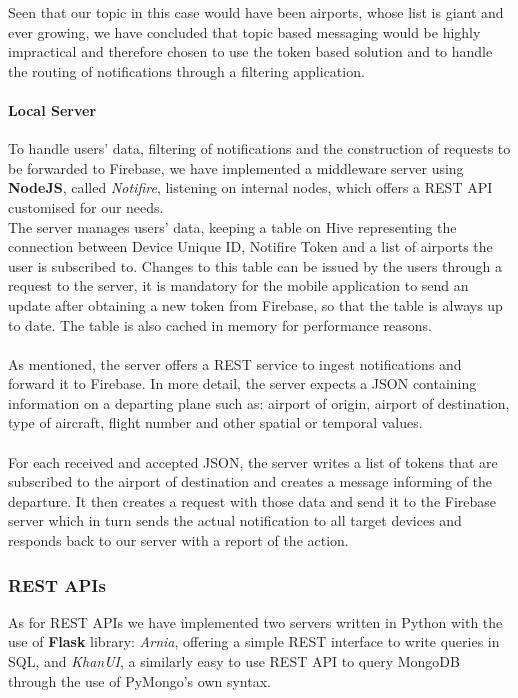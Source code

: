 Seen that our topic in this case would have been airports, whose list is giant and ever growing, we have concluded that topic based messaging would be highly impractical and therefore chosen to use the token based solution and to handle the routing of notifications through a filtering application.

\paragraph{Local Server}
To handle users' data, filtering of notifications and the construction of requests to be forwarded to Firebase, we have implemented a middleware server using \textbf{NodeJS}, called \textit{Notifire}, listening on internal nodes, which offers a REST API customised for our needs.
\\
The server manages users' data, keeping a table on Hive representing the connection between Device Unique ID, Notifire Token and a list of airports the user is subscribed to. Changes to this table can be issued by the users through a request to the server, it is mandatory for the mobile application to send an update after obtaining a new token from Firebase, so that the table is always up to date.
The table is also cached in memory for performance reasons.
\\ \\
As mentioned, the server offers a REST service to ingest notifications and forward it to Firebase. In more detail, the server expects a JSON containing information on a departing plane such as: airport of origin, airport of destination, type of aircraft, flight number and other spatial or temporal values.
\\ \\
For each received and accepted JSON, the server writes a list of tokens that are subscribed to the airport of destination and creates a message informing of the departure. It then creates a request with those data and send it to the Firebase server which in turn sends the actual notification to all target devices and responds back to our server with a report of the action.
\pagebreak
\subsubsection{REST APIs}
As for REST APIs we have implemented two servers written in Python with the use of \textbf{Flask} library: \textit{Arnia}, offering a simple REST interface to write queries in SQL, and \textit{KhanUI}, a similarly easy to use REST API to query MongoDB through the use of PyMongo's own syntax.

